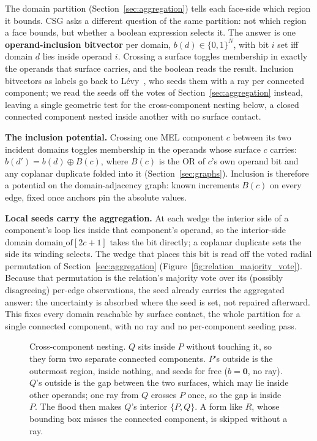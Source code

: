\documentclass{egpubl}
\begin{document}
The domain partition (Section~\ref{sec:aggregation}) tells each face-side which region it bounds. CSG asks a different question of the same partition: not which region a face bounds, but whether a boolean expression selects it. The answer is one \textbf{operand-inclusion bitvector} per domain, $b(d) \in \{0,1\}^N$, with bit $i$ set iff domain $d$ lies inside operand $i$. Crossing a surface toggles membership in exactly the operands that surface carries, and the boolean reads the result. Inclusion bitvectors as labels go back to L\'evy~\cite{Levy2025}, who seeds them with a ray per connected component; we read the seeds off the votes of Section~\ref{sec:aggregation} instead, leaving a single geometric test for the cross-component nesting below, a closed connected component nested inside another with no surface contact.

\textbf{The inclusion potential.} Crossing one MEL component $c$ between its two incident domains toggles membership in the operands whose surface $c$ carries: $b(d') = b(d) \oplus B(c)$, where $B(c)$ is the OR of $c$'s own operand bit and any coplanar duplicate folded into it (Section~\ref{sec:graphs}). Inclusion is therefore a potential on the domain-adjacency graph: known increments $B(c)$ on every edge, fixed once anchors pin the absolute values.

\textbf{Local seeds carry the aggregation.} At each wedge the interior side of a component's loop lies inside that component's operand, so the interior-side domain $\text{domain\_of}[2c+1]$ takes the bit directly; a coplanar duplicate sets the side its winding selects. The wedge that places this bit is read off the voted radial permutation of Section~\ref{sec:aggregation} (Figure~\ref{fig:relation_majority_vote}). Because that permutation is the relation's majority vote over its (possibly disagreeing) per-edge observations, the seed already carries the aggregated answer: the uncertainty is absorbed where the seed is set, not repaired afterward. This fixes every domain reachable by surface contact, the whole partition for a single connected component, with no ray and no per-component seeding pass.

\begin{figure}[t]
  \centering
  
  \caption{Cross-component nesting. $Q$ sits inside $P$ without touching it, so they form two separate connected components. $P$'s outside is the outermost region, inside nothing, and seeds for free ($b = \mathbf{0}$, no ray). $Q$'s outside is the gap between the two surfaces, which may lie inside other operands; one ray from $Q$ crosses $P$ once, so the gap is inside $P$. The flood then makes $Q$'s interior $\{P,Q\}$. A form like $R$, whose bounding box misses the connected component, is skipped without a ray.}
  \label{fig:cross_component_nesting}
\end{figure}
\end{document}

